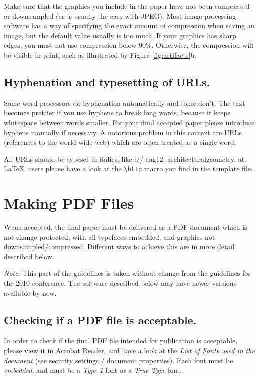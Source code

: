 \documentclass[twoside]{article}
\begin{document}
Make sure that the graphics you include in the paper have not been 
compressed or downsampled (as is usually the case with JPEG). Most image 
processing software has a way of specifying the exact amount of 
compression when saving an image, but the default value usually is too 
much. If your graphics has sharp edges, you must not use compression below 
90\%. Otherwise, the compression will be visible in print, such as 
illustrated by Figure \ref{fig:artifacts}b.

\subsection{Hyphenation and typesetting of URLs.}

Some word processors do hyphenation automatically and some don't. The
text becomes prettier if you use hyphens to break long words, because
it keeps whitespace between words smaller. For your final accepted paper
please introduce hyphens manually if necessary. A notorious problem in this
context are URLs (references to the world wide web) which are often treated
as a single word. 

All URLs should be typeset in italics, like
{\http:// aag12. architecturalgeometry. at}. \LaTeX\ users
please have a look at the \verb|\http| macro you find in the template file.


\section{Making PDF Files}

When accepted, the final paper must be delivered as a PDF document which 
is not change protected, with all typefaces embedded, and graphics not 
downsampled/compressed. Different ways to achieve this are in more detail 
described below. 

{\it Note:} This part of the guidelines is taken without change from
the guidelines for the 2010 conference. The software described below
may have newer versions available by now.


\subsection{Checking if a PDF file is acceptable.}

In order to check if the final PDF file intended for publication is 
acceptable, please view it in Acrobat Reader, and have a look at the {\em 
List of Fonts used in the document} (see security settings / document 
properties). Each font must be {\em embedded}, and must be a {\em Type-1} 
font or a {\em True-Type} font.
\end{document}
